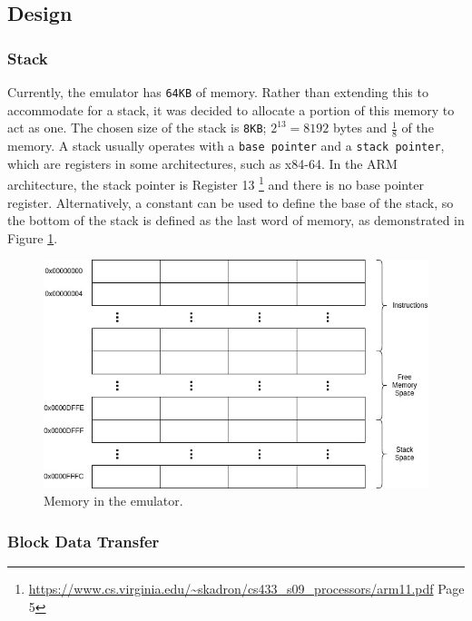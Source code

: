 \documentclass[11pt]{article}
\begin{document}
\subsection{Design}

\subsubsection{Stack}

Currently, the emulator has \texttt{64KB} of memory. Rather than extending this to accommodate for a stack, it was decided to allocate a portion of this memory to act as one. The chosen size of the stack is \texttt{8KB}; $2^{13} = 8192$  bytes and $\frac{1}{8}$ of the memory. 
A stack usually operates with a \texttt{base pointer} and a \texttt{stack pointer}, which are registers in some architectures, such as x84-64. In the ARM architecture, the stack pointer is Register 13 \footnote{\label{stackpointerfoot} \url{https://www.cs.virginia.edu/~skadron/cs433\_s09\_processors/arm11.pdf} Page 5}
and there is no base pointer register. Alternatively, a constant can be used to define the base of the stack, so the bottom of the stack is defined as the last word of memory, as demonstrated in Figure \ref{fig:memory}.

\begin{figure}[h!]
	\includegraphics[width=\linewidth]{memory.jpg}
	\caption{Memory in the emulator.}
	\label{fig:memory}
\end{figure}





\subsubsection{Block Data Transfer}
\end{document}

